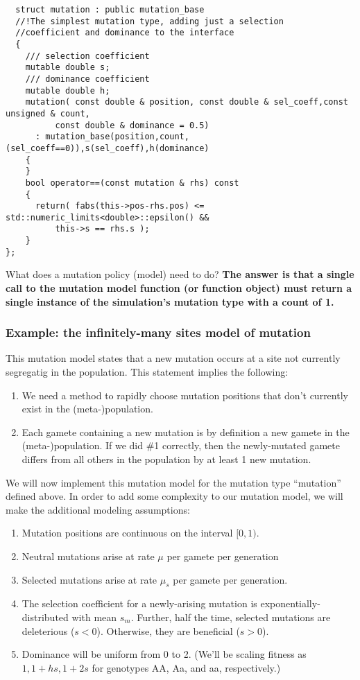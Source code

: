 \documentclass{article}
\begin{document}
\begin{lstlisting}
  struct mutation : public mutation_base
  //!The simplest mutation type, adding just a selection 
  //coefficient and dominance to the interface
  {
    /// selection coefficient
    mutable double s;
    /// dominance coefficient
    mutable double h;
    mutation( const double & position, const double & sel_coeff,const unsigned & count,
	      const double & dominance = 0.5) 
      : mutation_base(position,count,(sel_coeff==0)),s(sel_coeff),h(dominance)
    {
    }
    bool operator==(const mutation & rhs) const
    {
      return( fabs(this->pos-rhs.pos) <= std::numeric_limits<double>::epsilon() &&
	      this->s == rhs.s );
    }
};
\end{lstlisting}

What does a mutation policy (model) need to do?  \textbf{The answer is that a single call to the mutation model function (or function object) must return a single instance of the simulation's mutation type with a count of 1.}

\subsubsection{Example: the infinitely-many sites model of mutation}
\label{infsites}
This mutation model states that a new mutation occurs at a site not currently segregatig in the population.  This statement implies the following:
\begin{enumerate}
\item We need a method to rapidly choose mutation positions that don't currently exist in the (meta-)population.
\item Each gamete containing a new mutation is by definition a new gamete in the (meta-)population.  If we did \#1 correctly, then the newly-mutated gamete differs from all others in the population by at least 1 new mutation.
\end{enumerate}

We will now implement this mutation model for the mutation type ``mutation'' defined above.  In order to add some complexity to our mutation model, we will make the additional modeling assumptions:
\begin{enumerate}
\item Mutation positions are continuous on the interval $[0,1)$.
\item Neutral mutations arise at rate $\mu$ per gamete per generation
\item Selected mutations arise at rate $\mu_s$ per gamete per generation.
\item The selection coefficient for a newly-arising mutation is exponentially-distributed with mean $s_m$.  Further, half the time, selected mutations are deleterious ($s < 0$).  Otherwise, they are beneficial ($s > 0$).
\item Dominance will be uniform from 0 to 2.  (We'll be scaling fitness as $1, 1+hs, 1+2s$ for genotypes AA, Aa, and aa, respectively.)
\end{enumerate}
\end{document}
